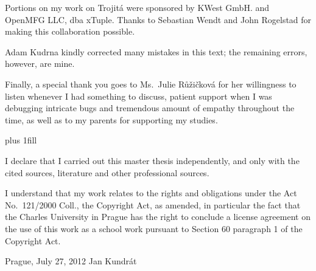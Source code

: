 \documentclass[11pt,a4paper]{report}
\begin{document}
Portions on my work on Trojitá were sponsored by KWest GmbH. and OpenMFG LLC, dba xTuple.  Thanks to Sebastian Wendt and
John Rogelstad for making this collaboration possible.

Adam Kudrna kindly corrected many mistakes in this text; the remaining errors, however, are mine.

Finally, a special thank you goes to Ms.~Julie Růžičková for her willingness to listen whenever I had something to
discuss, patient support when I was debugging intricate bugs and tremendous amount of empathy throughout the time, as
well as to my parents for supporting my studies.
\newpage

\vglue 0pt plus 1fill

\noindent
I declare that I carried out this master thesis independently, and only with the cited sources, literature and other
professional sources.

\medskip\noindent
I understand that my work relates to the rights and obligations under the Act No.~121/2000 Coll., the Copyright Act, as
amended, in particular the fact that the Charles University in Prague has the right to conclude a license agreement on
the use of this work as a school work pursuant to Section 60 paragraph 1 of the Copyright Act.

\vspace{30mm}

\noindent Prague, July 27, 2012 \hspace{\fill}Jan Kundrát\\

\vspace{20mm}
\newpage
\end{document}
